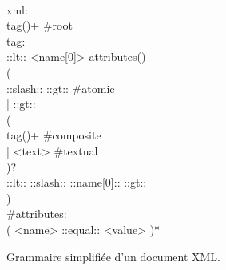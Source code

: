 \begin{figure}

\begin{bigpre}
\\
xml: \\
    tag()+ #root \\
tag: \\
    ::lt:: <name[0]> attributes() \\
    ( \\
      ::slash:: ::gt:: #atomic \\
    | ::gt:: \\
      ( \\
          tag()+ #composite \\
        | <text> #textual \\
      )? \\
      ::lt:: ::slash:: ::name[0]:: ::gt:: \\
    ) \\
#attributes: \\
    ( <name> ::equal:: <value> )*
\end{bigpre}

\caption{\label{figure:data:xml} Grammaire simplifiée d'un document XML.}

\end{figure}

